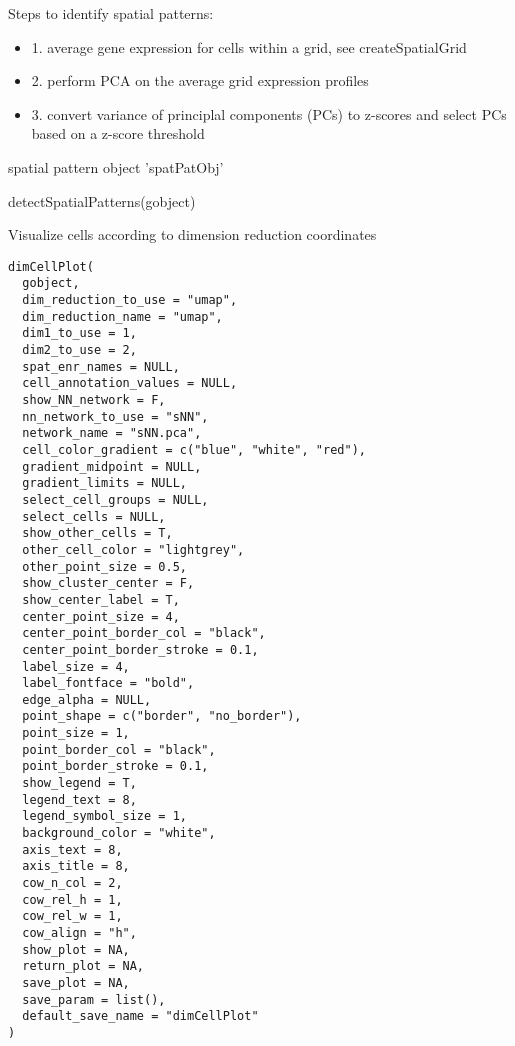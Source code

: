 \documentclass[a4paper]{book}
\begin{document}
%
\begin{Details}\relax
Steps to identify spatial patterns:
\begin{itemize}

\item{} 1. average gene expression for cells within a grid, see createSpatialGrid
\item{} 2. perform PCA on the average grid expression profiles
\item{} 3. convert variance of principlal components (PCs) to z-scores and select PCs based on a z-score threshold

\end{itemize}

\end{Details}
%
\begin{Value}
spatial pattern object 'spatPatObj'
\end{Value}
%
\begin{Examples}
\begin{ExampleCode}
    detectSpatialPatterns(gobject)
\end{ExampleCode}
\end{Examples}
%
\begin{Description}\relax
Visualize cells according to dimension reduction coordinates
\end{Description}
%
\begin{Usage}
\begin{verbatim}
dimCellPlot(
  gobject,
  dim_reduction_to_use = "umap",
  dim_reduction_name = "umap",
  dim1_to_use = 1,
  dim2_to_use = 2,
  spat_enr_names = NULL,
  cell_annotation_values = NULL,
  show_NN_network = F,
  nn_network_to_use = "sNN",
  network_name = "sNN.pca",
  cell_color_gradient = c("blue", "white", "red"),
  gradient_midpoint = NULL,
  gradient_limits = NULL,
  select_cell_groups = NULL,
  select_cells = NULL,
  show_other_cells = T,
  other_cell_color = "lightgrey",
  other_point_size = 0.5,
  show_cluster_center = F,
  show_center_label = T,
  center_point_size = 4,
  center_point_border_col = "black",
  center_point_border_stroke = 0.1,
  label_size = 4,
  label_fontface = "bold",
  edge_alpha = NULL,
  point_shape = c("border", "no_border"),
  point_size = 1,
  point_border_col = "black",
  point_border_stroke = 0.1,
  show_legend = T,
  legend_text = 8,
  legend_symbol_size = 1,
  background_color = "white",
  axis_text = 8,
  axis_title = 8,
  cow_n_col = 2,
  cow_rel_h = 1,
  cow_rel_w = 1,
  cow_align = "h",
  show_plot = NA,
  return_plot = NA,
  save_plot = NA,
  save_param = list(),
  default_save_name = "dimCellPlot"
)
\end{verbatim}
\end{Usage}
\end{document}
